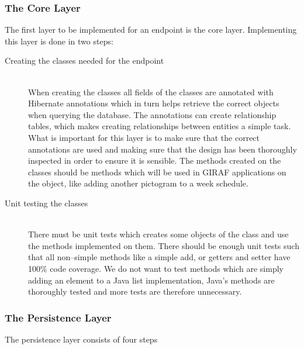 \subsubsection{The Core Layer}
The first layer to be implemented for an endpoint is the core layer.
Implementing this layer is done in two steps:
\begin{description}
	\item[Creating the classes needed for the endpoint] \hfill \\
	When creating the classes all fields of the classes are annotated with Hibernate annotations which in turn helps retrieve the correct objects when querying the database.
	The annotations can create relationship tables, which makes creating relationships between entities a simple task.
	What is important for this layer is to make sure that the correct annotations are used and making sure that the design has been thoroughly inspected in order to ensure it is sensible.
	The methods created on the classes should be methods which will be used in GIRAF applications on the object, like adding another pictogram to a week schedule.
	\item[Unit testing the classes] \hfill \\
	There must be unit tests which creates some objects of the class and use the methods implemented on them.
	There should be enough unit tests such that all non--simple methods like a simple add, or getters and setter have 100\% code coverage.
	We do not want to test methods which are simply adding an element to a Java list implementation, Java's methods are thoroughly tested and more tests are therefore unnecessary. 
\end{description}

\noindent
\subsubsection{The Persistence Layer}
The persistence layer consists of four steps

